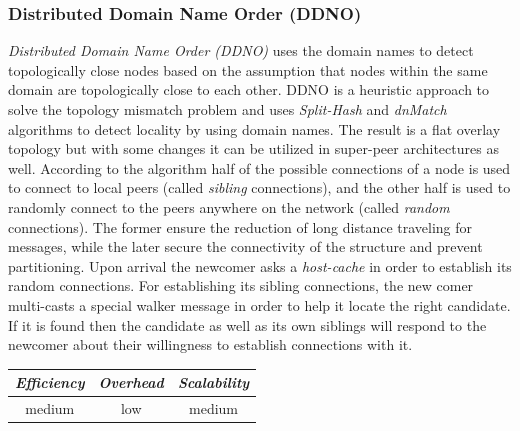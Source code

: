 \subsubsection{Distributed Domain Name Order (DDNO)}
\emph{Distributed Domain Name Order (DDNO)} \cite{Z-YK2005} uses the domain
names to detect topologically close nodes based on the assumption that nodes
within the same domain are topologically close to each other. DDNO is a
heuristic approach to solve the topology mismatch problem and uses
\emph{Split-Hash} and \emph{dnMatch} algorithms to detect locality by using
domain names. The result is a flat overlay topology but with some changes it
can be utilized in super-peer architectures as well. According to the algorithm
half of the possible connections of a node is used to connect to local peers
(called \emph{sibling} connections), and the other half is used to randomly
connect to the peers anywhere on the network (called \emph{random} connections).
The former ensure the reduction of long distance traveling for messages, while
the later secure the connectivity of the structure and prevent partitioning.
Upon arrival the newcomer asks a \emph{host-cache} in order to establish its
random connections. For establishing its sibling connections, the new comer
multi-casts a special walker message in order to help it locate the right
candidate. If it is found then the candidate as well as its own siblings will
respond to the newcomer about their willingness to establish connections with
it.

\begin{center}
\begin{tabular}{ccc}
\emph{Efficiency} & \emph{Overhead} & \emph{Scalability} \\
\hline
medium &
low &
medium
\end{tabular}
\end{center}

